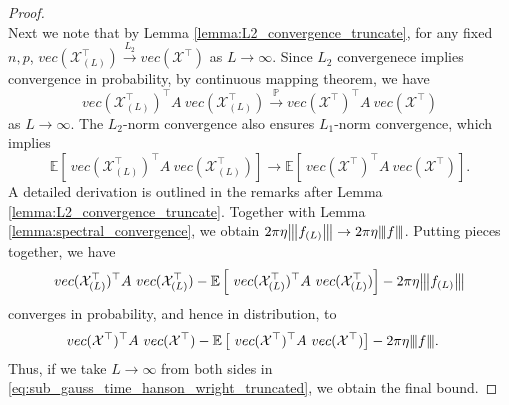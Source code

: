 \begin{proof}
\begin{equation}
\end{equation} 
Next we note that by Lemma \ref{lemma:L2_convergence_truncate}, for any fixed $n, p$,  $vec(\mathcal{X}_{(L)}^\top)\overset{L_2}{\rightarrow}vec(\mathcal{X^\top})$ as $L \rightarrow \infty$. Since $L_2$ convergenece implies convergence in probability, by  continuous mapping theorem, we have   
\begin{equation}
vec(\mathcal{X}_{(L)}^\top)^\top A ~vec(\mathcal{X}_{(L)}^\top)\overset{\mathbb{P}}{\rightarrow}vec(\mathcal{X}^\top)^\top A ~vec(\mathcal{X}^\top)
\end{equation}
as $L \rightarrow \infty$. The $L_2$-norm  convergence also ensures $L_1$-norm convergence,  which implies   
\begin{equation}
     \mathbb{E} \left[~vec(\mathcal{X}_{(L)}^\top)^\top A ~vec(\mathcal{X}_{(L)}^\top)\right] \rightarrow  \mathbb{E} \left[~vec(\mathcal{X}^\top )^\top A ~vec(\mathcal{X}^\top)\right].
\end{equation}
A detailed derivation is outlined in the remarks after Lemma \ref{lemma:L2_convergence_truncate}. Together with Lemma \ref{lemma:spectral_convergence}, we obtain  $2\pi \eta{\left\vert\kern-0.25ex\left\vert\kern-0.25ex\left\vert f_{(L)} \right\vert\kern-0.25ex\right\vert\kern-0.25ex\right\vert}  \rightarrow 2\pi \eta{\left\vert\kern-0.25ex\left\vert\kern-0.25ex\left\vert f \right\vert\kern-0.25ex\right\vert\kern-0.25ex\right\vert}$. Putting pieces together, we have
\begin{equation*}
\begin{aligned}
&vec(\mathcal{X}_{(L)}^\top)^\top A ~vec(\mathcal{X}_{(L)}^\top )-\mathbb{E} \left[~vec(\mathcal{X}_{(L)}^\top)^\top A ~vec(\mathcal{X}_{(L)}^\top)\right]-2\pi \eta{\left\vert\kern-0.25ex\left\vert\kern-0.25ex\left\vert f_{(L)} \right\vert\kern-0.25ex\right\vert\kern-0.25ex\right\vert} \\
\end{aligned}
\end{equation*}
converges in probability, and hence in distribution, to 
\begin{equation*}
\begin{aligned}
&
vec(\mathcal{X}^\top )^\top A ~vec(\mathcal{X}^\top)-\mathbb{E} \left[~vec(\mathcal{X}^\top)^\top A ~vec(\mathcal{X}^\top)\right]-2\pi \eta{\left\vert\kern-0.25ex\left\vert\kern-0.25ex\left\vert f \right\vert\kern-0.25ex\right\vert\kern-0.25ex\right\vert}. 
\end{aligned}
\end{equation*}
Thus, if we take $L\rightarrow \infty$ from both sides in \eqref{eq:sub_gauss_time_hanson_wright_truncated}, we obtain the final bound. 
\end{proof}
